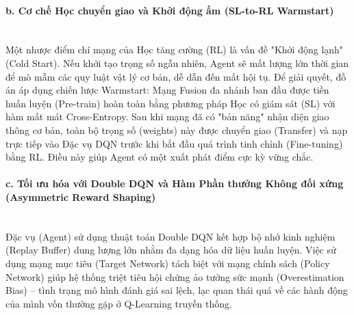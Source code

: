 \paragraph{b. Cơ chế Học chuyển giao và Khởi động ấm (SL-to-RL Warmstart)} \mbox{} \\
Một nhược điểm chí mạng của Học tăng cường (RL) là vấn đề "Khởi động lạnh" (Cold Start). Nếu khởi tạo trọng số ngẫu nhiên, Agent sẽ mất lượng lớn thời gian để mò mẫm các quy luật vật lý cơ bản, dễ dẫn đến mất hội tụ. Để giải quyết, đồ án áp dụng chiến lược Warmstart: Mạng Fusion đa nhánh ban đầu được tiền huấn luyện (Pre-train) hoàn toàn bằng phương pháp Học có giám sát (SL) với hàm mất mát Cross-Entropy. Sau khi mạng đã có "bản năng" nhận diện giao thông cơ bản, toàn bộ trọng số (weights) này được chuyển giao (Transfer) và nạp trực tiếp vào Đặc vụ DQN trước khi bắt đầu quá trình tinh chỉnh (Fine-tuning) bằng RL. Điều này giúp Agent có một xuất phát điểm cực kỳ vững chắc.

\paragraph{c. Tối ưu hóa với Double DQN và Hàm Phần thưởng Không đối xứng (Asymmetric Reward Shaping)} \mbox{} \\
Đặc vụ (Agent) sử dụng thuật toán Double DQN kết hợp bộ nhớ kinh nghiệm (Replay Buffer) dung lượng lớn nhằm đa dạng hóa dữ liệu huấn luyện. Việc sử dụng mạng mục tiêu (Target Network) tách biệt với mạng chính sách (Policy Network) giúp hệ thống triệt tiêu hội chứng ảo tưởng sức mạnh (Overestimation Bias) – tình trạng mô hình đánh giá sai lệch, lạc quan thái quá về các hành động của mình vốn thường gặp ở Q-Learning truyền thống.

